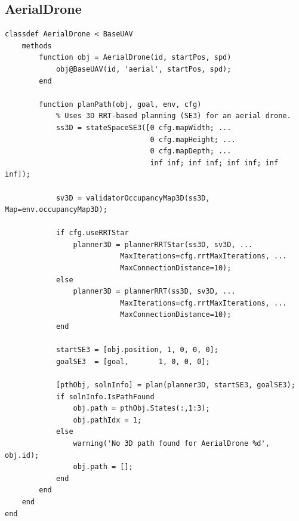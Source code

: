 \documentclass[12pt,a4paper]{report}
\begin{document}
\subsection{AerialDrone}
\label{sec:aerial_drone_code}
\begin{verbatim}
classdef AerialDrone < BaseUAV
    methods
        function obj = AerialDrone(id, startPos, spd)
            obj@BaseUAV(id, 'aerial', startPos, spd);
        end

        function planPath(obj, goal, env, cfg)
            % Uses 3D RRT-based planning (SE3) for an aerial drone.
            ss3D = stateSpaceSE3([0 cfg.mapWidth; ...
                                  0 cfg.mapHeight; ...
                                  0 cfg.mapDepth; ...
                                  inf inf; inf inf; inf inf; inf inf]);

            sv3D = validatorOccupancyMap3D(ss3D, Map=env.occupancyMap3D);

            if cfg.useRRTStar
                planner3D = plannerRRTStar(ss3D, sv3D, ...
                           MaxIterations=cfg.rrtMaxIterations, ...
                           MaxConnectionDistance=10);
            else
                planner3D = plannerRRT(ss3D, sv3D, ...
                           MaxIterations=cfg.rrtMaxIterations, ...
                           MaxConnectionDistance=10);
            end

            startSE3 = [obj.position, 1, 0, 0, 0];
            goalSE3  = [goal,       1, 0, 0, 0];

            [pthObj, solnInfo] = plan(planner3D, startSE3, goalSE3);
            if solnInfo.IsPathFound
                obj.path = pthObj.States(:,1:3);
                obj.pathIdx = 1;
            else
                warning('No 3D path found for AerialDrone %d', obj.id);
                obj.path = [];
            end
        end
    end
end
\end{verbatim}
\end{document}
